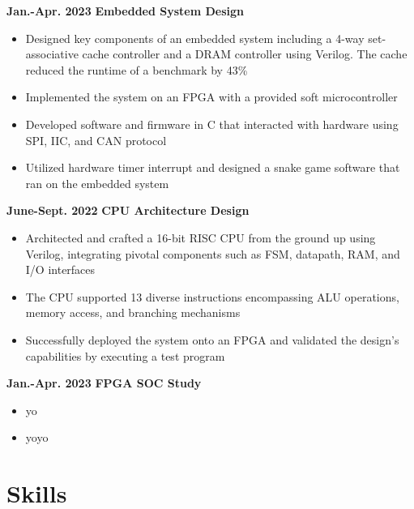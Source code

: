 \documentclass[11pt,a4paper,sans]{moderncv}
\begin{document}
\cventry
{\textnormal{\textbf{Jan.-Apr. 2023}}}
{\textnormal{\textbf{Embedded System Design}}}
{}{}{}
{
    \begin{itemize}
    \item Designed key components of an embedded system including a 4-way set-associative cache controller and a DRAM controller using Verilog. The cache reduced the runtime of a benchmark by 43\%
    \item Implemented the system on an FPGA with a provided soft microcontroller 
    \item Developed software and firmware in C that interacted with hardware using SPI, IIC, and CAN protocol 
    \item Utilized hardware timer interrupt and designed a snake game software that ran on the embedded system
    \end{itemize}
}

\cventry
{\textnormal{\textbf{June-Sept. 2022}}}
{\textnormal{\textbf{CPU Architecture Design}}}
{}{}{}
{
    \begin{itemize}
    \item Architected and crafted a 16-bit RISC CPU from the ground up using Verilog, integrating pivotal components such as FSM, datapath, RAM, and I/O interfaces
    \item The CPU supported 13 diverse instructions encompassing ALU operations, memory access, and branching mechanisms
    \item Successfully deployed the system onto an FPGA and validated the design's capabilities by executing a test program
\end{itemize}
}

\cventry
{\textnormal{\textbf{Jan.-Apr. 2023}}}
{\textnormal{\textbf{FPGA SOC Study}}}
{}{}{}
{
    \begin{itemize}
    \item yo
    \item yoyo
    \end{itemize}
}

\section{Skills}

\end{document}
